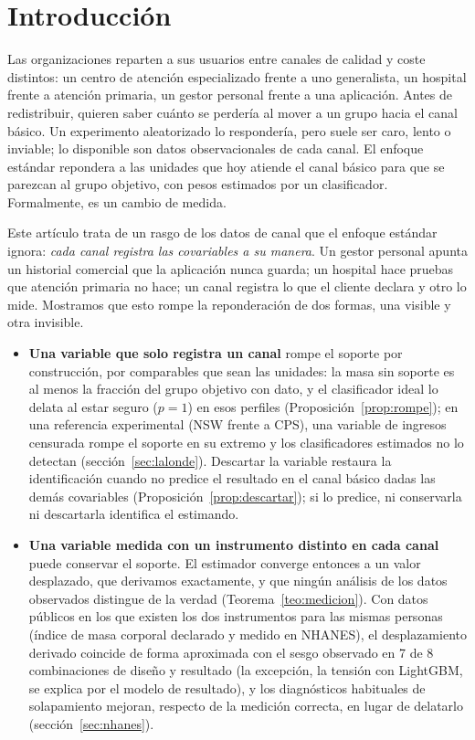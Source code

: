 \section{Introducción}\label{sec:intro}

Las organizaciones reparten a sus usuarios entre canales de calidad y coste distintos: un centro de atención especializado frente a uno generalista, un hospital frente a atención primaria, un gestor personal frente a una aplicación. Antes de redistribuir, quieren saber cuánto se perdería al mover a un grupo hacia el canal básico. Un experimento aleatorizado lo respondería, pero suele ser caro, lento o inviable; lo disponible son datos observacionales de cada canal. El enfoque estándar repondera a las unidades que hoy atiende el canal básico para que se parezcan al grupo objetivo, con pesos estimados por un clasificador. Formalmente, es un cambio de medida.

Este artículo trata de un rasgo de los datos de canal que el enfoque estándar ignora: \emph{cada canal registra las covariables a su manera}. Un gestor personal apunta un historial comercial que la aplicación nunca guarda; un hospital hace pruebas que atención primaria no hace; un canal registra lo que el cliente declara y otro lo mide. Mostramos que esto rompe la reponderación de dos formas, una visible y otra invisible.
\begin{itemize}
  \item \textbf{Una variable que solo registra un canal} rompe el soporte por construcción, por comparables que sean las unidades: la masa sin soporte es al menos la fracción del grupo objetivo con dato, y el clasificador ideal lo delata al estar seguro ($p=1$) en esos perfiles (Proposición~\ref{prop:rompe}); en una referencia experimental (NSW frente a CPS), una variable de ingresos censurada rompe el soporte en su extremo y los clasificadores estimados no lo detectan (sección~\ref{sec:lalonde}). Descartar la variable restaura la identificación cuando no predice el resultado en el canal básico dadas las demás covariables (Proposición~\ref{prop:descartar}); si lo predice, ni conservarla ni descartarla identifica el estimando.
  \item \textbf{Una variable medida con un instrumento distinto en cada canal} puede conservar el soporte. El estimador converge entonces a un valor desplazado, que derivamos exactamente, y que ningún análisis de los datos observados distingue de la verdad (Teorema~\ref{teo:medicion}). Con datos públicos en los que existen los dos instrumentos para las mismas personas (índice de masa corporal declarado y medido en NHANES), el desplazamiento derivado coincide de forma aproximada con el sesgo observado en 7 de 8 combinaciones de diseño y resultado (la excepción, la tensión con LightGBM, se explica por el modelo de resultado), y los diagnósticos habituales de solapamiento mejoran, respecto de la medición correcta, en lugar de delatarlo (sección~\ref{sec:nhanes}).
\end{itemize}


